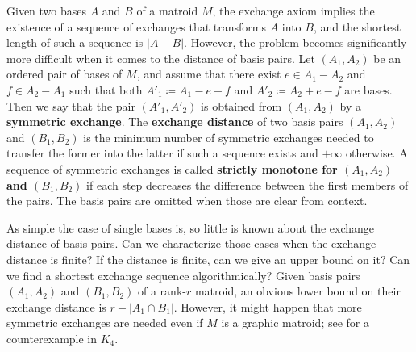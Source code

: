 \documentclass[11pt,a4paper]{article}
\theoremstyle{plain}
\theoremstyle{definition}
\newcommand{\tnote}[1]{{\color{blue}[{\tiny \textbf{Tamás:} \bf #1}]\marginpar{\color{blue}*}}}
\newcommand{\tnote}[1]{}
\newcommand{\cB}{\mathcal{B}}
\begin{document}

Given two bases $A$ and $B$ of a matroid $M$, the exchange axiom implies the existence of a sequence of exchanges that transforms $A$ into $B$, and the shortest length of such a sequence is $|A-B|$. However, the problem becomes significantly more difficult when it comes to the distance of basis pairs. Let $(A_1,A_2)$ be an ordered pair of bases of $M$, and assume that there exist $e\in A_1-A_2$ and $f\in A_2-A_1$ such that both $A'_1\coloneqq A_1-e+f$ and $A'_2\coloneqq A_2+e-f$ are bases. Then we say that the pair $(A'_1,A'_2)$ is obtained from $(A_1,A_2)$ by a \textbf{symmetric exchange}. The \textbf{exchange distance} of two basis pairs $(A_1,A_2)$ and $(B_1,B_2)$ is the minimum number of symmetric exchanges needed to transfer the former into the latter if such a sequence exists and $+\infty$ otherwise. A sequence of symmetric exchanges is called \textbf{strictly monotone for $(A_1,A_2)$ and $(B_1,B_2)$} if each step decreases the difference between the first members of the pairs. The basis pairs are omitted when those are clear from context.

As simple the case of single bases is, so little is known about the exchange distance of basis pairs. Can we characterize those cases when the exchange distance is finite? If the distance is finite, can we give an upper bound on it? Can we find a shortest exchange sequence algorithmically? Given basis pairs $(A_1,A_2)$ and $(B_1,B_2)$ of a rank-$r$ matroid, an obvious lower bound on their exchange distance is $r-|A_1\cap B_1|$. However, it might happen that more symmetric exchanges are needed even if $M$ is a graphic matroid; see \cite{farber1989basis} for a counterexample in $K_4$. 
\end{document}
